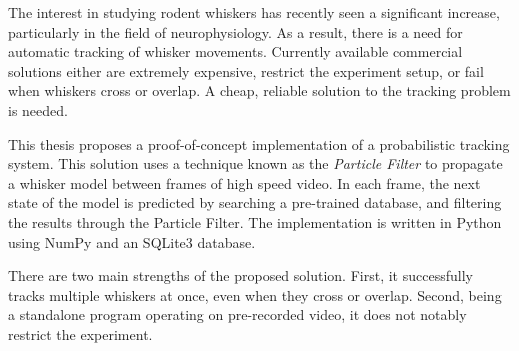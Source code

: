 The interest in studying rodent whiskers has recently seen a significant increase, particularly in the field of neurophysiology. As a result, there is a need for automatic tracking of whisker movements. Currently available commercial solutions either are extremely expensive, restrict the experiment setup, or fail when whiskers cross or overlap. A cheap, reliable solution to the tracking problem is needed.

This thesis proposes a proof-of-concept implementation of a probabilistic tracking system. This solution uses a technique known as the \emph{Particle Filter} to propagate a whisker model between frames of high speed video. In each frame, the next state of the model is predicted by searching a pre-trained database, and filtering the results through the Particle Filter. The implementation is written in Python using NumPy and an SQLite3 database.

There are two main strengths of the proposed solution. First, it successfully tracks multiple whiskers at once, even when they cross or overlap. Second, being a standalone program operating on pre-recorded video, it does not notably restrict the experiment.
